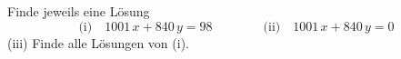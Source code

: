 \begin{aufgabe}
Finde jeweils eine Lösung
\[
\text{(i)}\quad 1001\,x + 840\,y = 98 \qquad\qquad \text{(ii)}\quad 1001\,x + 840\,y = 0
\]
(iii) Finde alle Lösungen von (i).
\end{aufgabe}
